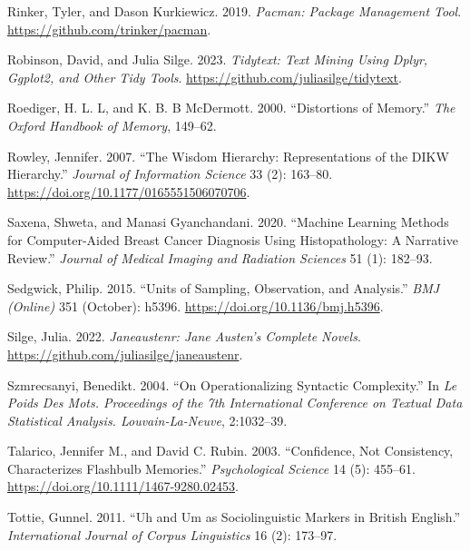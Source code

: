 \documentclass[
  letterpaper,
  DIV=11,
  numbers=noendperiod]{scrreport}
\newlength{\cslhangindent}
\newlength{\cslentryspacingunit} %
\newenvironment{CSLReferences}[2] %
 {%
  \setlength{\parindent}{0pt}
  \ifodd #1
  \let\oldpar\par
  \def\par{\hangindent=\cslhangindent\oldpar}
  \fi
  \setlength{\parskip}{#2\cslentryspacingunit}
 }%
 {}
\theoremstyle{definition}
\theoremstyle{remark}
\begin{document}
\begin{CSLReferences}{1}{0}
\leavevmode{}%
Rinker, Tyler, and Dason Kurkiewicz. 2019. \emph{Pacman: Package
Management Tool}. \url{https://github.com/trinker/pacman}.

\leavevmode{}%
Robinson, David, and Julia Silge. 2023. \emph{Tidytext: Text Mining
Using Dplyr, Ggplot2, and Other Tidy Tools}.
\url{https://github.com/juliasilge/tidytext}.

\leavevmode{}%
Roediger, H. L. L, and K. B. B McDermott. 2000. {``Distortions of
Memory.''} \emph{The Oxford Handbook of Memory}, 149--62.

\leavevmode{}%
Rowley, Jennifer. 2007. {``The Wisdom Hierarchy: Representations of the
DIKW Hierarchy.''} \emph{Journal of Information Science} 33 (2):
163--80. \url{https://doi.org/10.1177/0165551506070706}.

\leavevmode{}%
Saxena, Shweta, and Manasi Gyanchandani. 2020. {``Machine Learning
Methods for Computer-Aided Breast Cancer Diagnosis Using Histopathology:
A Narrative Review.''} \emph{Journal of Medical Imaging and Radiation
Sciences} 51 (1): 182--93.

\leavevmode{}%
Sedgwick, Philip. 2015. {``Units of Sampling, Observation, and
Analysis.''} \emph{BMJ (Online)} 351 (October): h5396.
\url{https://doi.org/10.1136/bmj.h5396}.

\leavevmode{}%
Silge, Julia. 2022. \emph{Janeaustenr: Jane Austen's Complete Novels}.
\url{https://github.com/juliasilge/janeaustenr}.

\leavevmode{}%
Szmrecsanyi, Benedikt. 2004. {``On Operationalizing Syntactic
Complexity.''} In \emph{Le Poids Des Mots. Proceedings of the 7th
International Conference on Textual Data Statistical Analysis.
Louvain-La-Neuve}, 2:1032--39.

\leavevmode{}%
Talarico, Jennifer M., and David C. Rubin. 2003. {``Confidence, Not
Consistency, Characterizes Flashbulb Memories.''} \emph{Psychological
Science} 14 (5): 455--61. \url{https://doi.org/10.1111/1467-9280.02453}.

\leavevmode{}%
Tottie, Gunnel. 2011. {``Uh and Um as Sociolinguistic Markers in British
English.''} \emph{International Journal of Corpus Linguistics} 16 (2):
173--97.


\end{CSLReferences}
\end{document}

